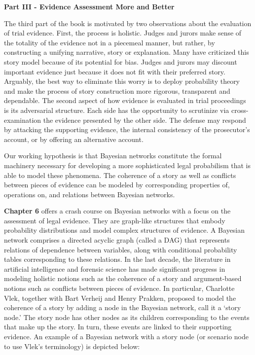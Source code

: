 \documentclass[
  10pt,
  dvipsnames,enabledeprecatedfontcommands]{scrartcl}
\begin{document}
\noindent \textbf{Part III - Evidence Assessment More and Better}

\noindent The third part of the book is motivated by two observations
about the evaluation of trial evidence. First, the process is holistic.
Judges and jurors make sense of the totality of the evidence not in a
piecemeal manner, but rather, by constructing a unifying narrative,
story or explanation. Many have criticized this story model because of
its potential for bias. Judges and jurors may discount important
evidence just because it does not fit with their preferred story.
Arguably, the best way to eliminate this worry is to deploy probability
theory and make the process of story construction more rigorous,
transparent and dependable. The second aspect of how evidence is
evaluated in trial proceedings is its adversarial structure. Each side
has the opportunity to scrutinize via cross-examination the evidence
presented by the other side. The defense may respond by attacking the
supporting evidence, the internal consistency of the prosecutor's
account, or by offering an alternative account.

Our working hypothesis is that Bayesian networks constitute the formal
machinery necessary for developing a more sophisticated legal
probabilism that is able to model these phenomena. The coherence of a
story as well as conflicts between pieces of evidence can be modeled by
corresponding properties of, operations on, and relations between
Bayesian networks.

\textbf{Chapter 6} offers a crash course on Bayesian networks with a
focus on the assessment of legal evidence. They are graph-like
structures that embody probability distributions and model complex
structures of evidence. A Bayesian network comprises a directed acyclic
graph (called a DAG) that represents relations of dependence between
variables, along with conditional probability tables corresponding to
these relations. In the last decade, the literature in artificial
intelligence and forensic science has made significant progress in
modeling holistic notions such as the coherence of a story and
argument-based notions such as conflicts between pieces of evidence. In
particular, Charlotte Vlek, together with Bart Verheij and Henry
Prakken, proposed to model the coherence of a story by adding a node in
the Bayesian network, call it a `story node.' The story node has other
nodes as its children corresponding to the events that make up the
story. In turn, these events are linked to their supporting evidence. An
example of a Bayesian network with a story node (or scenario node to use
Vlek's terminology) is depicted below:
\end{document}
